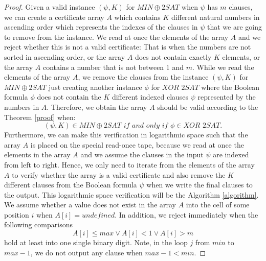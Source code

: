 \documentclass[a4paper,UKenglish,cleveref, autoref]{lipics-v2019}
\begin{document}
\begin{proof}
Given a valid instance $(\psi, K)$ for $MIN\oplus2SAT$ when $\psi$ has $m$ clauses, we can create a certificate array $A$ which contains $K$ different natural numbers in ascending order which represents the indexes of the clauses in $\psi$ that we are going to remove from the instance. We read at once the elements of the array $A$ and we reject whether this is not a valid certificate: That is when the numbers are not sorted in ascending order, or the array $A$ does not contain exactly $K$ elements, or the array $A$ contains a number that is not between $1$ and $m$. While we read the elements of the array $A$, we remove the clauses from the instance $(\psi, K)$ for $MIN\oplus2SAT$ just creating another instance $\phi$ for $\textit{XOR 2SAT}$ where the Boolean formula $\phi$ does not contain the $K$ different indexed clauses $\psi$ represented by the numbers in $A$. Therefore, we obtain the array $A$ should be valid according to the Theorem \ref{proof} when:
\[(\psi, K) \in MIN\oplus2SAT \textit{ if and only if } \phi \in \textit{XOR 2SAT}.\]
Furthermore, we can make this verification in logarithmic space such that the array $A$ is placed on the special read-once tape, because we read at once the elements in the array $A$ and we assume the clauses in the input $\psi$ are indexed from left to right. Hence, we only need to iterate from the elements of the array $A$ to verify whether the array is a valid certificate and also remove the $K$ different clauses from the Boolean formula $\psi$ when we write the final clauses to the output. This logarithmic space verification will be the Algorithm \ref{algorithm}. We assume whether a value does not exist in the array $A$ into the cell of some position $i$ when $A[i] = undefined$. In addition, we reject immediately when the following comparisons
\[A[i] \leq max \vee A[i] < 1 \vee A[i] > m\]
hold at least into one single binary digit. Note, in the loop $j$ from $min$ to $max - 1$, we do not output any clause when $max - 1 < min$.


\end{proof}
\end{document}
